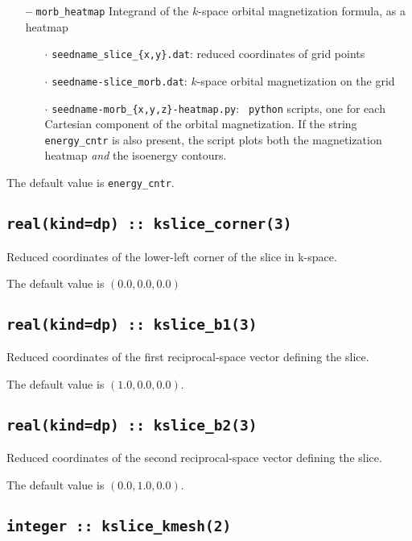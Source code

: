 \begin{itemize}
\item[{\bf --}] \verb#morb_heatmap# Integrand of the $k$-space orbital
  magnetization formula, as a heatmap

  \begin{itemize}

  \item[$\cdot$] {\tt seedname\_slice\_\{x,y\}.dat}: reduced coordinates
    of grid points 
    
  \item[$\cdot$] {\tt seedname-slice\_morb.dat}: $k$-space orbital
    magnetization on the grid
    
  \item[$\cdot$] {\tt seedname-morb\_\{x,y,z\}-heatmap.py}: {\tt
      python} scripts, one for each Cartesian component of the orbital
    magnetization. If the string {\tt energy\_cntr} is also present,
    the script plots both the magnetization heatmap {\it and} the
    isoenergy contours.
    
  \end{itemize}

\end{itemize}

The default value is {\tt energy\_cntr}.

\subsection[kslice\_corner]{\tt real(kind=dp) :: kslice\_corner(3)}
Reduced coordinates of the lower-left corner of the slice in k-space.

The default value is $(0.0,0.0,0.0)$

\subsection[kslice\_corner]{\tt real(kind=dp) :: kslice\_b1(3)}
Reduced coordinates of the first reciprocal-space vector 
defining the slice.

The default value is $(1.0,0.0,0.0)$.

\subsection[kslice\_corner]{\tt real(kind=dp) :: kslice\_b2(3)}
Reduced coordinates of the second reciprocal-space vector 
defining the slice.

The default value is $(0.0,1.0,0.0)$.

\subsection[kslice\_num\_points]{\tt integer :: kslice\_kmesh(2)}

